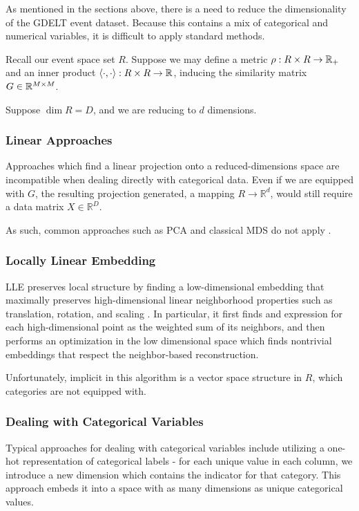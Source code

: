 
As mentioned in the sections above, there is a need to reduce the dimensionality of the GDELT event dataset. Because this contains a mix of categorical and numerical variables, it is difficult to apply standard methods.

Recall our event space set $R$. Suppose we may define a metric $\rho:R\times R\rightarrow \mathbb{R}_+$ and an inner product $\langle \cdot, \cdot \rangle:R\times R\rightarrow\mathbb{R}$, inducing the similarity matrix $G\in\mathbb{R}^{M\times M}$.

Suppose $\dim R = D$, and we are reducing to $d$ dimensions.

\subsubsection{Linear Approaches}

Approaches which find a linear projection onto a reduced-dimensions space are incompatible when dealing directly with categorical data. Even if we are equipped with $G$, the resulting projection generated, a mapping $R\rightarrow \mathbb{R}^d$, would still require a data matrix $X\in\mathbb{R}^D$.

As such, common approaches such as PCA and classical MDS do not apply \cite{cunningham2015linear}.

\subsubsection{Locally Linear Embedding}

LLE preserves local structure by finding a low-dimensional embedding that maximally preserves high-dimensional linear neighborhood properties such as translation, rotation, and scaling \cite{roweis2000nonlinear}. In particular, it first finds and expression for each high-dimensional point as the weighted sum of its neighbors, and then performs an optimization in the low dimensional space which finds nontrivial embeddings that respect the neighbor-based reconstruction.

Unfortunately, implicit in this algorithm is a vector space structure in $R$, which categories are not equipped with. 

\subsubsection{Dealing with Categorical Variables}

Typical approaches for dealing with categorical variables include utilizing a one-hot representation of categorical labels - for each unique value in each column, we introduce a new dimension which contains the indicator for that category. This approach embeds it into a space with as many dimensions as unique categorical values.

